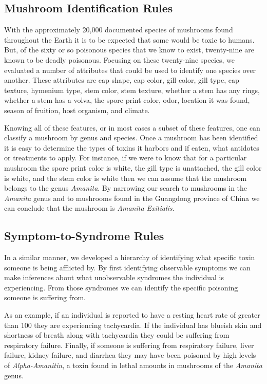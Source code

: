 \documentclass[12pt, conference, compsocconf]{IEEEtran}
\begin{document}
\subsection{Mushroom Identification Rules}
With the approximately 20,000 documented species of mushrooms found throughout the Earth it is to be expected that some would be toxic to humans. But, of the sixty or so poisonous species that we know to exist, twenty-nine are known to be deadly poisonous. 
Focusing on these twenty-nine species, we evaluated a number of attributes that could be used to identify one species over another. These attributes are cap shape, cap color, gill color, gill type, cap texture, hymenium type, stem color, stem texture, whether a stem has any rings, whether a stem has a volva, the spore print color, odor, location it was found, season of fruition, host organism, and climate. 

Knowing all of these features, or in most cases a subset of these features, one can classify a mushroom by genus and species. Once a mushroom has been identified it is easy to determine the types of toxins it harbors and if eaten, what antidotes or treatments to apply. 
For instance, if we were to know that for a particular mushroom the spore print color is white, the gill type is unattached, the gill color is white, and the stem color is white then we can assume that the mushroom belongs to the genus \emph{Amanita}. 
By narrowing our search to mushrooms in the \emph{Amanita} genus and to mushrooms found in the Guangdong province of China we can conclude that the mushroom is \emph{Amanita Exitialis}.

\subsection{Symptom-to-Syndrome Rules}
In a similar manner, we developed a hierarchy of identifying what specific toxin someone is being afflicted by. 
By first identifying observable symptoms we can make inferences about what unobservable syndromes the individual is experiencing. From those syndromes we can identify the specific poisoning someone is suffering from.

As an example, if an individual is reported to have a resting heart rate of greater than 100 they are experiencing tachycardia. If the individual has blueish skin and shortness of breath along with tachycardia they could be suffering from respiratory failure. 
Finally, if someone is suffering from respiratory failure, liver failure, kidney failure, and diarrhea they may have been poisoned by high levels of \emph{Alpha-Amanitin}, a toxin found in lethal amounts in mushrooms of the \emph{Amanita} genus.
\end{document}
